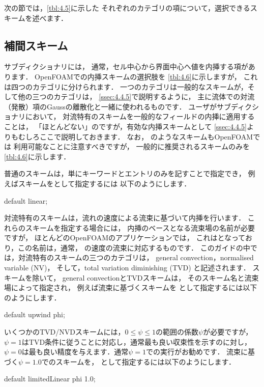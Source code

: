 次の節では，\autoref{tbl:4.5}に示した
それぞれのカテゴリの項について，選択できるスキームを述べます．


\subsection{補間スキーム}
\label{ssec:4.4.1}
サブディクショナリには，
通常，セル中心から界面中心へ値を内挿する項があります．
OpenFOAMでの内挿スキームの選択肢を
\autoref{tbl:4.6}に示しますが，
これは四つのカテゴリに分けられます．
一つのカテゴリは一般的なスキームが，そして他の三つのカテゴリは，
\autoref{ssec:4.4.5}で説明するように，
主に流体での対流（発散）項のGaussの離散化と一緒に使われるものです．
ユーザがサブディクショナリにおいて，
対流特有のスキームを一般的なフィールドの内挿に適用することは，
「ほとんどない」のですが，有効な内挿スキームとして
\autoref{ssec:4.4.5}よりもむしろここで説明しておきます．
なお，
%
%
のようなスキームもOpenFOAMでは
利用可能なことに注意すべきですが，
一般的に推奨されるスキームのみを\autoref{tbl:4.6}に示します．

普通のスキームは，単にキーワードとエントリのみを記すことで指定でき，
例えばスキームをとして指定するには
以下のようにします．
\begin{OFverbatim}[file]
default linear;
\end{OFverbatim}
対流特有のスキームは，流れの速度による流束に基づいて内挿を行います．
これらのスキームを指定する場合には，
内挿のベースとなる流束場の名前が必要ですが，
ほとんどのOpenFOAMのアプリケーションでは，
これはとなっており，この名前は，通常，
の速度の流束に対応するものです．
このガイドの中では，対流特有のスキームの三つのカテゴリは，
general convection，normalised variable (NV)，
そして，total variation diminishing (TVD) と記述されます．
スキームを除いて，
general convectionとTVDスキームは，
そのスキーム名と流束場によって指定され，
例えば流束に基づくスキームを
として指定するには以下のようにします．
\begin{OFverbatim}[file]
default upwind phi;
\end{OFverbatim}
いくつかのTVD/NVDスキームには，$0 \le \psi \le 1$の範囲の係数$\psi$が必要ですが，
$\psi = 1$はTVD条件に従うことに対応し，通常最も良い収束性を示すのに対し，
$\psi = 0$は最も良い精度を与えます．通常$\psi = 1$での実行がお勧めです．
流束に基づく$\psi = 1.0$でのスキームを，
として指定するには以下のようにします．
\begin{OFverbatim}[file]
default limitedLinear phi 1.0;
\end{OFverbatim}

